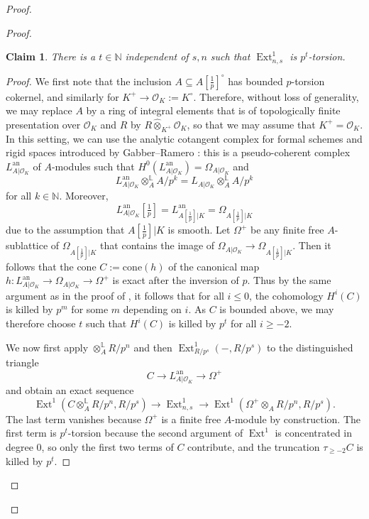 \documentclass[10pt,a4paper]{article}
\newtheorem{Claim}[thm]{Claim}
\theoremstyle{definition}
\theoremstyle{remark}
\newcommand{\lra}{\longrightarrow}
\newcommand{\N}{\mathbb{N}}
\renewcommand{\O}{\mathcal{O}}
\newcommand{\an}{{\mathrm{an}}}
\newcommand{\tf}{[\tfrac{1}{p}]}
\newcommand{\Ext}{\operatorname{Ext}}
\numberwithin{equation}{section}
\begin{document}
\begin{proof}
\begin{proof}
 		\begin{Claim}
 			There is a $t\in \N$ independent of $s,n$ such that $\Ext_{n,s}^1$ is $p^t$-torsion.
 		\end{Claim}

                \begin{proof}
 			We first note that the inclusion $A\subseteq A\tf^\circ$ has bounded $p$-torsion cokernel, and similarly for $K^+\to \O_K:=K^\circ$. Therefore, without loss of generality, we may replace $A$ by a ring of integral elements that is of topologically finite presentation over $\O_K$ and $R$ by $R\hat{\otimes}_{K^+}\O_K$, so that we  may assume that  $K^+=\O_K$.
 			In this setting, we can use the analytic cotangent complex for formal schemes and rigid spaces introduced by Gabber--Ramero \cite[Section~7]{GabberRamero}: this is a pseudo-coherent complex $L^{\an}_{ A|\O_K}$ of $A$-modules such that $H^0(L^{\an}_{ A|\O_K})=\Omega_{A|\O_K}$ and \[L^{\an}_{ A|\O_K}\otimes^{\mathbb L}_{A}A/p^k=L_{ A|\O_K}\otimes^{\mathbb L}_{A}A/p^k\]
 			for all $k\in \N$. Moreover, 
 			\[L^{\an}_{ A|\O_K}\tf=L^{\an}_{ A[\frac{1}{p}]|K}=\Omega_{A[\frac{1}{p}]|K}\]
 			due to the assumption that $A[\tfrac{1}{p}]|K$ is smooth. 
 			Let $\Omega^+$ be any finite free $A$-sublattice of $\Omega_{A[\frac{1}{p}]|K}$ that contains the image of $ \Omega_{A|\O_K}\to  \Omega_{A[\frac{1}{p}]|K}$. Then it follows that the cone $C:=\mathrm{cone}(h)$ of the canonical map $h\colon L^{\an}_{ A|\O_K}\to \Omega_{A|\O_K}\to \Omega^+$ is exact after the inversion of $p$. Thus by the same argument as in the proof of \cite[Proposition 6.10(iii)]{perfectoid-spaces}, it follows that for all $i\leq 0$, the cohomology $H^i(C)$ is killed by $p^m$ for some $m$ depending on $i$. As $C$ is bounded above, we may therefore choose $t$ such that $H^i(C)$ is killed by $p^t$ for all $i\geq -2$.
 			
 			We now first apply $\otimes^{\mathbb L}_{A}R/p^n$ and then $\Ext^1_{R/p^s}(-,R/p^s)$ to the distinguished triangle
 			\[ C\lra L^{\an}_{ A|\O_K}\lra \Omega^+\]
 			and obtain an exact sequence
 			\[ \Ext^1\left(C\otimes^{\mathbb L}_{A}R/p^n,R/p^s\right)\lra \Ext^1_{n,s}\lra \Ext^1\left(\Omega^+\otimes_{A}R/p^n,R/p^s\right).\]
 			The last term vanishes because $\Omega^+$ is a finite free $A$-module by construction.
 			The first term is $p^t$-torsion because the second argument of $\Ext^1$ is concentrated in degree $0$, so only the first two terms of $C$ contribute, and the truncation $\tau_{\geq -2}C$ is killed by $p^t$.
 		\end{proof}
                

\end{proof}
\end{proof}
\end{document}

